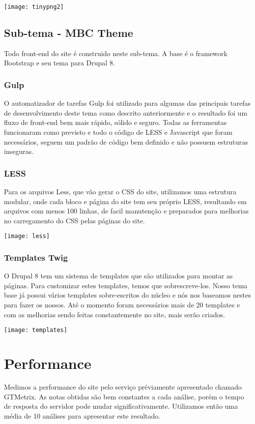 \texttt{[image: tinypng2]}

\subsection{Sub-tema - MBC Theme}
Todo front-end do site é construido neste sub-tema. A base é o framework Bootstrap e seu tema para Drupal 8. 

\subsubsection{Gulp}
O automatizador de tarefas Gulp foi utilizado para algumas das principais tarefas de desenvolvimento deste tema como descrito anteriormente e o resultado foi um fluxo de front-end bem mais rápido, sólido e seguro. Todas as ferramentas funcionaram como previsto e todo o código de LESS e Javascript que foram necessários, seguem um padrão de código bem definido e não possuem estruturas inseguras.

\subsubsection{LESS}
Para os arquivos Less, que vão gerar o CSS do site, utilizamos uma estrutura modular, onde cada bloco e página do site tem seu próprio LESS, resultando em arquivos com menos 100 linhas, de facil manutenção e preparados para melhorias no carregamento do CSS pelas páginas do site.

\texttt{[image: less]}

\subsubsection{Templates Twig}
O Drupal 8 tem um sistema de templates que são utilizados para montar as páginas. Para customizar estes templates, temos que sobrescreve-los. Nosso tema base já possui vários templates sobre-escritos do núcleo e nós nos baseamos nestes para fazer os nossos. Até o momento foram necessários mais de 20 templates e com as melhorias sendo feitas constantemente no site, mais serão criados.

\texttt{[image: templates]}

\section{Performance}

Medimos a performance do site pelo serviço préviamente apresentado chamado GTMetrix. As notas obtidas são bem constantes a cada análise, porém o tempo de resposta do servidor pode mudar significativamente. Utilizamos então uma média de 10 análises para apresentar este resultado.


